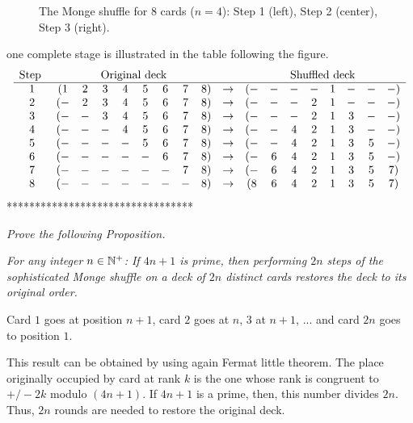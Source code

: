\begin{itemize}
\begin{enumerate}
{\begin{figure}[h]
\begin{center}
        \caption{The Monge shuffle for $8$ cards ($n=4$): Step 1 (left), Step 2 (center), Step 3 (right).}
        \label{fig:suffleMonge1}
\end{center}
\end{figure}
one complete stage is illustrated in the table following the figure.
\[ \begin{array}{cccccccccccccccccc}
\mbox{Step } & \multicolumn{8}{c}{\mbox{Original deck}} & &
     \multicolumn{8}{c}{\mbox{Shuffled deck}} \\
\hline
1 & (1 & 2 & 3 & 4 & 5 & 6 & 7 & 8) & \rightarrow & ( - & - & - & - & 1 & - &  - & - ) \\
2 & ( - & 2 & 3 & 4 & 5 & 6 & 7 & 8) & \rightarrow & ( - & - & - & 2 & 1 & - & - & - ) \\
3 & ( - & - & 3 & 4 & 5 & 6 & 7 & 8) &  \rightarrow& ( - & - & - & 2 & 1 & 3 & - & - ) \\
4 & ( - & - & - & 4 & 5 & 6 & 7 & 8) &  \rightarrow& ( - & - & 4 & 2 & 1 & 3 & - & - ) \\
5 & ( - & - & - & - & 5 & 6 & 7 & 8) &  \rightarrow& ( - & - & 4 & 2 & 1 & 3 & 5 & - ) \\
6 & ( - & - & - & - & - & 6 & 7 & 8) &  \rightarrow& ( - & 6 & 4 & 2 & 1 & 3 & 5 & - ) \\
7 & ( - & - & - & - & - & - & 7 & 8) &  \rightarrow& ( - & 6 & 4 & 2 & 1 & 3 & 5 & 7 ) \\
8 & ( - & - & - & - & - & - & - & 8) &  \rightarrow& ( 8 & 6 & 4 & 2 & 1 & 3 & 5 & 7 ) \\
\end{array}
\]
*********************************}

{\em Prove the following Proposition.}

{\em For any integer $n \in \mathbb{N}^+$: 
If $4n+1$ is prime, then performing $2n$ steps of the sophisticated Monge shuffle on a deck of $2n$ distinct cards 
restores the deck to its original order.}
\smallskip

Card $1$ goes at position $n+1$, card $2$ goes at $n$, $3$ at $n+1$, ... and card $2n$ goes to position $1$.

This result can be obtained by using again Fermat little theorem.
The place originally occupied by card at rank $k$ is the one whose rank is congruent to $+/- 2k$ modulo $(4n+1)$.
If $4n+1$ is a prime, then, this number divides $2n$.
Thus, $2n$ rounds are needed to restore the original deck. 
\end{enumerate}
  
\end{itemize}


